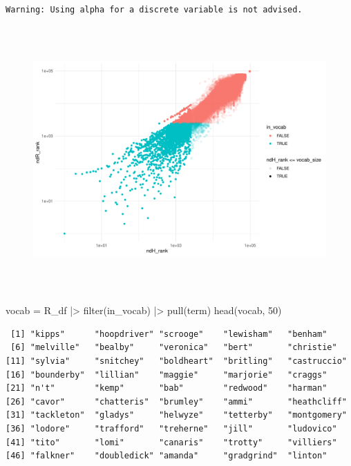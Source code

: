 \documentclass[
]{article}
\newenvironment{Shaded}{\begin{snugshade}}{\end{snugshade}}
\newcommand{\DecValTok}[1]{\textcolor[rgb]{0.68,0.00,0.00}{#1}}
\newcommand{\FunctionTok}[1]{\textcolor[rgb]{0.28,0.35,0.67}{#1}}
\newcommand{\NormalTok}[1]{\textcolor[rgb]{0.00,0.23,0.31}{#1}}
\newcommand{\OtherTok}[1]{\textcolor[rgb]{0.00,0.23,0.31}{#1}}
\newcommand{\SpecialCharTok}[1]{\textcolor[rgb]{0.37,0.37,0.37}{#1}}
\begin{document}
\begin{verbatim}
Warning: Using alpha for a discrete variable is not advised.
\end{verbatim}

\begin{figure}[H]

{\centering \includegraphics[width=6in,height=4in]{paper_files/figure-pdf/unnamed-chunk-44-2.pdf}

}

\end{figure}

\begin{Shaded}
\begin{Highlighting}[]
\NormalTok{vocab }\OtherTok{=}\NormalTok{ R\_df }\SpecialCharTok{|\textgreater{}} 
    \FunctionTok{filter}\NormalTok{(in\_vocab) }\SpecialCharTok{|\textgreater{}} 
    \FunctionTok{pull}\NormalTok{(term)}
\FunctionTok{head}\NormalTok{(vocab, }\DecValTok{50}\NormalTok{)}
\end{Highlighting}
\end{Shaded}

\begin{verbatim}
 [1] "kipps"      "hoopdriver" "scrooge"    "lewisham"   "benham"    
 [6] "melville"   "bealby"     "veronica"   "bert"       "christie"  
[11] "sylvia"     "snitchey"   "boldheart"  "britling"   "castruccio"
[16] "bounderby"  "lillian"    "maggie"     "marjorie"   "craggs"    
[21] "n't"        "kemp"       "bab"        "redwood"    "harman"    
[26] "cavor"      "chatteris"  "brumley"    "ammi"       "heathcliff"
[31] "tackleton"  "gladys"     "helwyze"    "tetterby"   "montgomery"
[36] "lodore"     "trafford"   "treherne"   "jill"       "ludovico"  
[41] "tito"       "lomi"       "canaris"    "trotty"     "villiers"  
[46] "falkner"    "doubledick" "amanda"     "gradgrind"  "linton"    
\end{verbatim}
\end{document}

